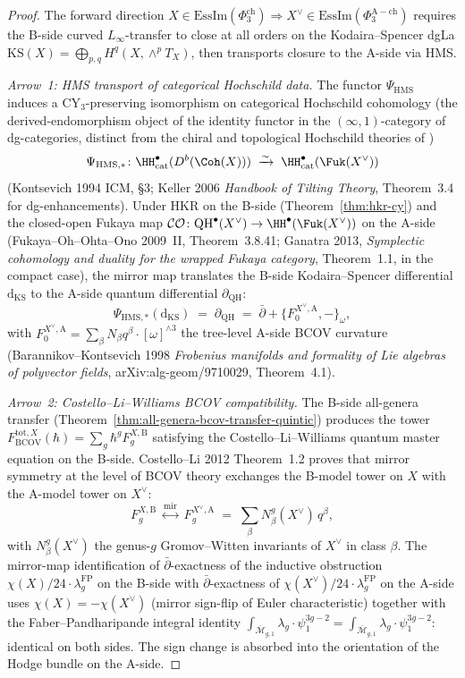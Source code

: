 \begin{proof}
The forward direction $X \in \mathrm{EssIm}(\Phi_3^{\mathrm{ch}}) \Rightarrow X^\vee \in \mathrm{EssIm}(\Phi_3^{\mathrm{A-ch}})$ requires the B-side curved $L_\infty$-transfer to close at all orders on the Kodaira--Spencer dgLa $\mathrm{KS}(X) = \bigoplus_{p,q} H^q(X, \wedge^p T_X)$, then transports closure to the A-side via HMS.

\textit{Arrow~1: HMS transport of categorical Hochschild data.} The functor $\Psi_{\mathrm{HMS}}$ induces a CY$_3$-preserving isomorphism on categorical Hochschild cohomology (the derived-endomorphism object of the identity functor in the $(\infty,1)$-category of dg-categories, distinct from the chiral and topological Hochschild theories of \cite{VolI})
\[
 \Psi_{\mathrm{HMS}, *} \colon \HH^\bullet_{\mathrm{cat}}(D^b(\Coh(X))) \;\xrightarrow{\sim}\; \HH^\bullet_{\mathrm{cat}}(\Fuk(X^\vee))
\]
(Kontsevich 1994 ICM, \S3; Keller 2006 \textit{Handbook of Tilting Theory}, Theorem~3.4 for dg-enhancements). Under HKR on the B-side (Theorem~\ref{thm:hkr-cy}) and the closed-open Fukaya map $\mathcal{CO} \colon \mathrm{QH}^\bullet(X^\vee) \to \HH^\bullet(\Fuk(X^\vee))$ on the A-side (Fukaya--Oh--Ohta--Ono 2009~II, Theorem~3.8.41; Ganatra 2013, \textit{Symplectic cohomology and duality for the wrapped Fukaya category}, Theorem~1.1, in the compact case), the mirror map translates the B-side Kodaira--Spencer differential $\mathrm{d}_{\mathrm{KS}}$ to the A-side quantum differential $\partial_{\mathrm{QH}}$:
\[
 \Psi_{\mathrm{HMS}, *}(\mathrm{d}_{\mathrm{KS}}) \;=\; \partial_{\mathrm{QH}} \;=\; \bar\partial + \{F^{X^\vee,\mathrm{A}}_0, -\}_\omega,
\]
with $F^{X^\vee,\mathrm{A}}_0 = \sum_\beta N_\beta q^\beta \cdot [\omega]^{\wedge 3}$ the tree-level A-side BCOV curvature (Barannikov--Kontsevich 1998 \textit{Frobenius manifolds and formality of Lie algebras of polyvector fields}, arXiv:alg-geom/9710029, Theorem~4.1).

\textit{Arrow~2: Costello--Li--Williams BCOV compatibility.} The B-side all-genera transfer (Theorem~\ref{thm:all-genera-bcov-transfer-quintic}) produces the tower $F^{\mathrm{tot},X}_{\mathrm{BCOV}}(\hbar) = \sum_g \hbar^g F^{X,\mathrm{B}}_g$ satisfying the Costello--Li--Williams quantum master equation on the B-side. Costello--Li 2012 Theorem~1.2 proves that mirror symmetry at the level of BCOV theory exchanges the B-model tower on $X$ with the A-model tower on $X^\vee$:
\[
 F^{X,\mathrm{B}}_g \;\stackrel{\mathrm{mir}}{\longleftrightarrow}\; F^{X^\vee,\mathrm{A}}_g \;=\; \sum_{\beta} N^{g}_{\beta}(X^\vee) \, q^\beta,
\]
with $N^g_\beta(X^\vee)$ the genus-$g$ Gromov--Witten invariants of $X^\vee$ in class $\beta$. The mirror-map identification of $\bar\partial$-exactness of the inductive obstruction $\chi(X)/24 \cdot \lambda_g^{\mathrm{FP}}$ on the B-side with $\bar\partial$-exactness of $\chi(X^\vee)/24 \cdot \lambda_g^{\mathrm{FP}}$ on the A-side uses $\chi(X) = -\chi(X^\vee)$ (mirror sign-flip of Euler characteristic) together with the Faber--Pandharipande integral identity $\int_{\overline{\mathcal{M}}_{g,1}} \lambda_g \cdot \psi_1^{3g-2} = \int_{\overline{\mathcal{M}}_{g,1}} \lambda_g \cdot \psi_1^{3g-2}$: identical on both sides. The sign change is absorbed into the orientation of the Hodge bundle on the A-side.


\end{proof}
